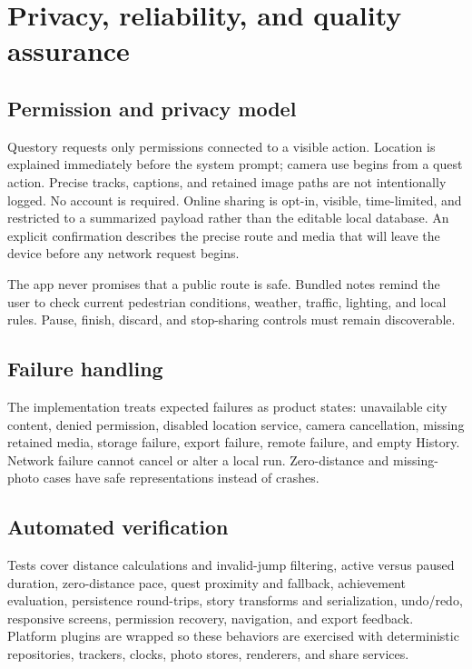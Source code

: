 \section{Privacy, reliability, and quality assurance}

\subsection{Permission and privacy model}
Questory requests only permissions connected to a visible action. Location is
explained immediately before the system prompt; camera use begins from a quest
action. Precise tracks, captions, and retained image paths are not intentionally
logged. No account is required. Online sharing is opt-in, visible, time-limited,
and restricted to a summarized payload rather than the editable local database.
An explicit confirmation describes the precise route and media that will leave
the device before any network request begins.

The app never promises that a public route is safe. Bundled notes remind the user
to check current pedestrian conditions, weather, traffic, lighting, and local
rules. Pause, finish, discard, and stop-sharing controls must remain discoverable.

\subsection{Failure handling}
The implementation treats expected failures as product states: unavailable city
content, denied permission, disabled location service, camera cancellation,
missing retained media, storage failure, export failure, remote failure, and
empty History. Network failure cannot cancel or alter a local run. Zero-distance
and missing-photo cases have safe representations instead of crashes.

\subsection{Automated verification}


Tests cover distance calculations and invalid-jump filtering, active versus
paused duration, zero-distance pace, quest proximity and fallback, achievement
evaluation, persistence round-trips, story transforms and serialization,
undo/redo, responsive screens, permission recovery, navigation, and export
feedback. Platform plugins are wrapped so these behaviors are exercised with
deterministic repositories, trackers, clocks, photo stores, renderers, and share
services.

